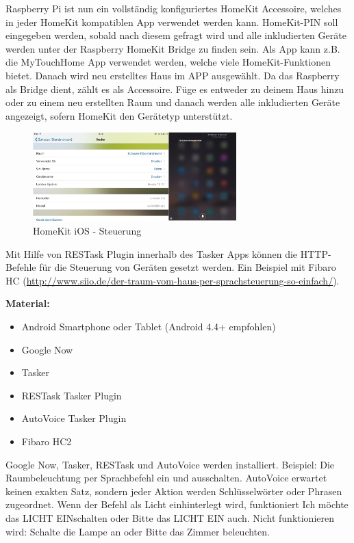 Raspberry Pi ist nun ein vollständig konfiguriertes HomeKit Accessoire, welches in jeder HomeKit kompatiblen App verwendet werden kann. HomeKit-PIN soll eingegeben werden, sobald nach diesem gefragt wird und alle inkludierten Geräte werden unter der Raspberry HomeKit Bridge zu finden sein. Als App kann z.B. die \glqq MyTouchHome\grqq{} App verwendet werden, welche viele HomeKit-Funktionen bietet. Danach wird neu erstelltes Haus im APP ausgewählt. Da das Raspberry als Bridge dient, zählt es als Accessoire. Füge es entweder zu deinem Haus hinzu oder zu einem neu erstellten Raum und danach werden alle inkludierten Geräte angezeigt, sofern HomeKit den Gerätetyp unterstützt.

\begin{figure}[h!]
	\centering
	\includegraphics[width=0.7\textwidth]{img/Feedback-Mechanismen/HomeKitSteuerung.png}
	\caption{HomeKit iOS - Steuerung}
	\label{fig:feedbackHomeKitSteuerung}
\end{figure}

Mit Hilfe von RESTask Plugin innerhalb des Tasker Apps können die HTTP-Befehle für die
Steuerung von Geräten gesetzt werden. Ein Beispiel mit Fibaro HC (\url{http://www.siio.de/der-traum-vom-haus-per-sprachsteuerung-so-einfach/}).

\textbf{Material:}

\begin{itemize}
\item Android Smartphone oder Tablet (Android 4.4+ empfohlen)
\item Google Now
\item Tasker
\item RESTask Tasker Plugin
\item AutoVoice Tasker Plugin
\item Fibaro HC2
\end{itemize}

Google Now, Tasker, RESTask und AutoVoice werden installiert.
Beispiel: Die Raumbeleuchtung per Sprachbefehl ein und ausschalten. AutoVoice erwartet keinen exakten Satz, sondern jeder Aktion werden Schlüsselwörter oder Phrasen zugeordnet. Wenn der Befehl als \glqq Licht ein\grqq hinterlegt wird, funktioniert \glqq Ich möchte das LICHT EINschalten\grqq{} oder \glqq Bitte das LICHT EIN\grqq{} auch. Nicht funktionieren wird: \glqq Schalte die Lampe an\grqq{} oder \glqq Bitte das Zimmer beleuchten\grqq.

